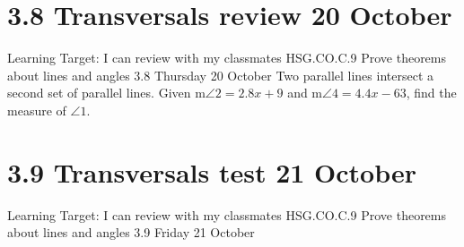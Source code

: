 \documentclass[onlytextwidth]{beamer}
\newcommand\paraticks{}
\def\paraticks{{Straight Barb[reversed, scale=2]}-{Straight Barb[scale=2]}}
\begin{document}
\section{3.8 Transversals review \hfill 20 October}
\begin{frame}{Learning Target: I can review with my classmates}
  {HSG.CO.C.9 Prove theorems about lines and angles \hfill \alert{3.8 Thursday 20 October}}
  Two parallel lines intersect a second set of parallel lines. Given m$\angle 2 = 2.8x+9$ and m$\angle 4 = 4.4x - 63$, find the measure of $\angle 1$. 
  \begin{flushright}
    \end{flushright}
\end{frame}

\section{3.9 Transversals test \hfill 21 October}
\begin{frame}{Learning Target: I can review with my classmates}
  {HSG.CO.C.9 Prove theorems about lines and angles \hfill \alert{3.9 Friday 21 October}}

\end{frame}
\end{document}
